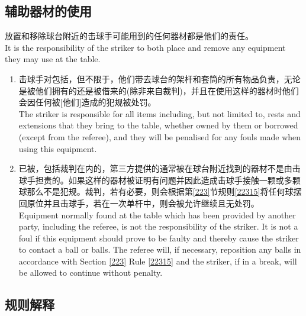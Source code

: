 \subsection{辅助器材的使用}\label{22320}

\noindent 放置和移除球台附近的击球手可能用到的任何器材都是他们的责任。\\
It is the responsibility of the striker to both place and remove any 
equipment they may use at the table.
\begin{enumerate}[label=(\alph*)]
    \item 击球手对包括，但不限于，他们带去球台的架杆和套筒的所有物品负责，无论是被他们拥有的还是被借来的(除非来自裁判)，并且在使用这样的器材时他们会因任何被[他们]造成的犯规被处罚。\\
    The striker is responsible for all items including, but not limited to, rests and extensions that they bring to the table, whether owned by them or borrowed (except from the referee), and they will be penalised for any fouls made when using this equipment.
    \item \label{22320b}已被，包括裁判在内的，第三方提供的通常被在球台附近找到的器材不是由击球手担责的。如果这样的器材被证明有问题并因此造成击球手接触一颗或多颗球那么不是犯规。裁判，若有必要，则会根据第\ref{223}节规则\ref{22315}将任何球摆回原位并且击球手，若在一次单杆中，则会被允许继续且无处罚。\\
    Equipment normally found at the table which has been provided by another party, including the referee, is not the responsibility of the striker. It is not a foul if this equipment should prove to be faulty and thereby cause the striker to contact a ball or balls. The referee will, if necessary, reposition any balls in accordance with Section \ref{223} Rule \ref{22315} and the striker, if in a break, will be allowed to continue without penalty.
\end{enumerate}

\subsection{规则解释}

